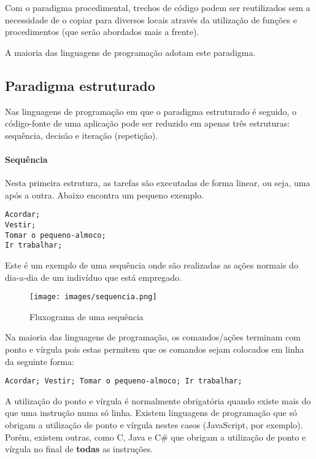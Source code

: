 Com o paradigma procedimental, trechos de código podem ser reutilizados sem a necessidade de o copiar para diversos locais através da utilização de funções e procedimentos (que serão abordados mais a frente). 

A maioria das linguagens de programação adotam este paradigma. 

\subsection{Paradigma estruturado}

Nas linguagens de programação em que o paradigma estruturado é seguido, o código-fonte de uma aplicação pode ser reduzido em apenas três estruturas: sequência, decisão e iteração (repetição).

\paragraph{Sequência}

Nesta primeira estrutura, as tarefas são executadas de forma linear, ou seja, uma após a outra. Abaixo encontra um pequeno exemplo.

\begin{lstlisting}
Acordar;        
Vestir;        
Tomar o pequeno-almoco;        
Ir trabalhar;  
\end{lstlisting}

Este é um exemplo de uma sequência onde são realizadas as ações normais do dia-a-dia de um indivíduo que está empregado.

\begin{figure}[!h]
\center\texttt{[image: images/sequencia.png]}
\caption{Fluxograma de uma sequência}
\end{figure}

Na maioria das linguagens de programação, os comandos/ações terminam com ponto e vírgula pois estas permitem que os comandos sejam colocados em linha da seguinte forma:

\begin{lstlisting}
Acordar; Vestir; Tomar o pequeno-almoco; Ir trabalhar; 
\end{lstlisting}

A utilização do ponto e vírgula é normalmente obrigatória quando existe mais do que uma instrução numa só linha. Existem linguagens de programação que só obrigam a utilização de ponto e vírgula nestes casos (JavaScript, por exemplo). Porém, existem outras, como C, Java e C\# que obrigam a utilização de ponto e vírgula no final de \textbf{todas} as instruções.

